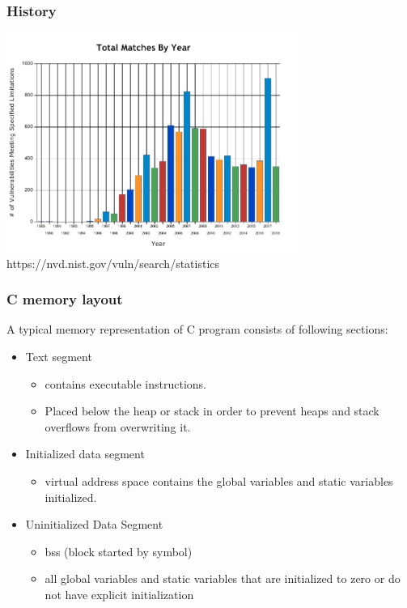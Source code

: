 \documentclass[serif,mathserif]{beamer}
\begin{document}
\begin{frame}
  \frametitle{History}
	\begin{center}
	\includegraphics[width=9.5cm]{reports.png}
    \\
	https://nvd.nist.gov/vuln/search/statistics
	\end{center}
    
\end{frame}

\begin{frame}
  \frametitle{C memory layout}
  A typical memory representation of C program consists of following sections:
  \begin{itemize}
  	\item
  		Text segment
  		\begin{itemize}
  			\item  contains executable instructions.
  			\item  Placed below the heap or stack in order to prevent heaps and stack overflows from overwriting it.
		\end{itemize}  		 
	\item
		Initialized data segment
		\begin{itemize}
			\item
			virtual address space contains the global variables and static variables initialized.
			
		\end{itemize}
	\item Uninitialized Data Segment
		\begin{itemize}
			\item bss (block started by symbol) 
			\item all global variables and static variables that are initialized to zero or do not have explicit initialization
		\end{itemize}							
  \end{itemize}
\end{frame}
\end{document}
